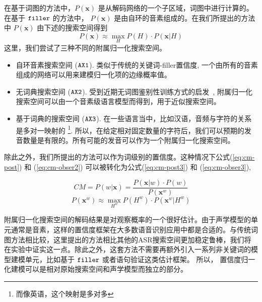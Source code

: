  在基于词图的方法中，$P(\mathbf{x})$ 是从解码网络的一个子区域，词图中进行计算的。在基于 $\tt filler$ 的方法中， $P(\mathbf{x})$ 是由自环的音素组成的。在我们所提出的方法中 $P(\mathbf{x})$ 由下述的搜索空间得到
 \begin{equation}\label{eq:cm-obser2}
 P(\mathbf{x})\approx \max_H P(H) \cdot  P(\mathbf{x}|H)
 \end{equation}
 这里，我们尝试了三种不同的附属归一化搜索空间。
 \begin{itemize}
     \item 自环音素搜索空间 ($\tt AX1$). 类似于传统的关键词-filler置信度\cite{young1994detecting},  一个由所有的音素组成的网络可以用来建模归一化项的边缘概率值。

     \item 无词典搜索空间 ($\tt AX2 $). 受到近期无词图鉴别性训练方式的启发~\cite{povey2016purely},  附属归一化搜索空间可以由一个音素级语言模型而得到，用于近似搜索空间。

     \item 基于词典的搜索空间 ($\tt AX3 $). 在一些语言当中，比如汉语，音频与字符的关系是多对一映射的 \footnote{而像英语，这个映射是多对多}. 所以，在给定相对固定数量的字符后，我们可以预期的发音数量是有限的。所有可能的发音可以作为一个附属归一化搜索空间。
 \end{itemize}
 除此之外，我们所提出的方法可以作为词级别的置信度。这种情况下公式(\ref{eq:cm-post}) 和 (\ref{eq:cm-obser2}) 可以被转化为公式(\ref{eq:cm-post3}) 和 (\ref{eq:cm-obser3}),

 \begin{equation}\label{eq:cm-post3}
        CM=P(w|\mathbf{x}) =
         \frac{P(\mathbf{x}|w)\cdot P(w)}{P(\mathbf{x}^{w})}
  \end{equation}
 \begin{equation}\label{eq:cm-obser3}
 P(\mathbf{x}^{w})\approx \max_{H^{w}} P(H^{w}) \cdot  P(\mathbf{x}^{w}|H^{w})
 \end{equation}
 
 附属归一化搜索空间的解码结果是对观察概率的一个很好估计。由于声学模型的单元通常是音素，这样的置信度框架在大多数语音识别应用中都是合适的。与传统词图方法相比较，这里提出的方法相比其他的ASR搜索空间更加稳定鲁棒，我们将在实验中证实这一点。除此之外，这套方法不需要再额外引入一系列非关键词的模型建模单元，比如基于 $\tt filler$ 或者语句验证这类估计框架。
 所以， 置信度归一化建模可以是相对原始搜索空间和声学模型而独立的部分。

